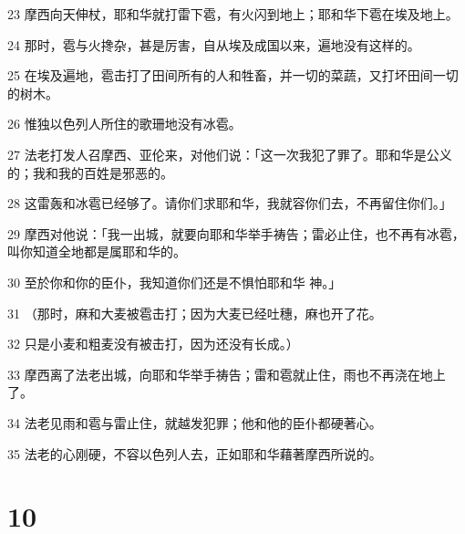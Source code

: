 \par 23 摩西向天伸杖，耶和华就打雷下雹，有火闪到地上；耶和华下雹在埃及地上。
\par 24 那时，雹与火搀杂，甚是厉害，自从埃及成国以来，遍地没有这样的。
\par 25 在埃及遍地，雹击打了田间所有的人和牲畜，并一切的菜蔬，又打坏田间一切的树木。
\par 26 惟独以色列人所住的歌珊地没有冰雹。
\par 27 法老打发人召摩西、亚伦来，对他们说：「这一次我犯了罪了。耶和华是公义的；我和我的百姓是邪恶的。
\par 28 这雷轰和冰雹已经够了。请你们求耶和华，我就容你们去，不再留住你们。」
\par 29 摩西对他说：「我一出城，就要向耶和华举手祷告；雷必止住，也不再有冰雹，叫你知道全地都是属耶和华的。
\par 30 至於你和你的臣仆，我知道你们还是不惧怕耶和华 神。」
\par 31 （那时，麻和大麦被雹击打；因为大麦已经吐穗，麻也开了花。
\par 32 只是小麦和粗麦没有被击打，因为还没有长成。）
\par 33 摩西离了法老出城，向耶和华举手祷告；雷和雹就止住，雨也不再浇在地上了。
\par 34 法老见雨和雹与雷止住，就越发犯罪；他和他的臣仆都硬著心。
\par 35 法老的心刚硬，不容以色列人去，正如耶和华藉著摩西所说的。

\chapter{10}

